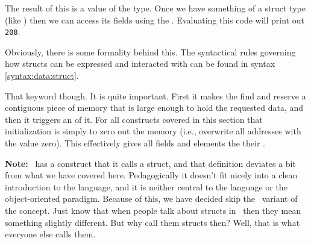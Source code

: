 \inputminted[lastline=2]{csharp}{../src/csharp/primdata/doorstruct/Program.cs}

The result of this is a value of the  type. Once we have something of a struct type (like ) then we can access its fields using the . Evaluating this code will print out \texttt{200}.

Obviously, there is some formality behind this. The syntactical rules governing how structs can be expressed and interacted with can be found in syntax \ref{syntax:data:struct}.

\begin{syntaxfloat}
  
  \caption{Structured data}
  \label{syntax:data:struct}
\end{syntaxfloat}

That  keyword though. It is quite important. First it makes the  find and reserve a contiguous piece of memory that is large enough to hold the requested data, and then it triggers an  of it. For all constructs covered in this section that initialization is simply to zero out the memory (i.e., overwrite all addresses with the value zero). This effectively gives all fields and elements the their .

\textbf{Note:} \csharp\ has a construct that it calls a struct, and that definition deviates a bit from what we have covered here. Pedagogically it doesn't fit nicely into a clean introduction to the language, and it is neither central to the language or the object-oriented paradigm. Because of this, we have decided skip the \csharp\ variant of the concept. Just know that when people talk about structs in \csharp\ then they mean something slightly different. But why call them structs then? Well, that is what everyone else calls them.

